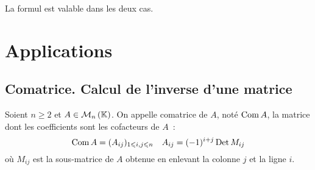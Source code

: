 La formul est valable dans les deux cas.


\section{Applications}

\subsection{Comatrice. Calcul de l'inverse d'une matrice}

\begin{defdef}
  Soient $n \geqslant 2$ et $A \in \mathcal{M}_{n}\left(\mathbb{K}\right)$. On appelle comatrice de $A$, noté $\operatorname{Com} A$, la matrice dont les coefficients sont les cofacteurs de $A$~:
  \begin{equation}
    \operatorname{Com} A = (A_{ij})_{1 \leqslant i,j \leqslant n} \quad A_{ij}=(-1)^{i+j} \operatorname{Det} M_{ij}
  \end{equation}
  où $M_{ij}$ est la sous-matrice de $A$ obtenue en enlevant la colonne $j$ et la ligne $i$.
\end{defdef}

